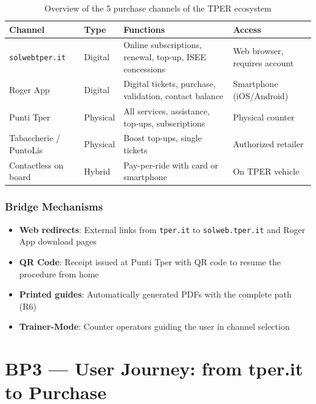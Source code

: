 ﻿\documentclass[11pt,a4paper]{article}
\begin{document}
\begin{table}[H]
\centering
\small
\renewcommand{\arraystretch}{1.3}
\begin{tabular}{|p{2.5cm}|p{3.5cm}|p{3.5cm}|p{3.5cm}|}
\hline
\textbf{Channel} & \textbf{Type} & \textbf{Functions} & \textbf{Access} \\
\hline
\texttt{solweb}\discretionary{-}{-}{.}\texttt{tper.it} & Digital & Online subscriptions, renewal, top-up, ISEE concessions & Web browser, requires account \\
\hline
Roger App & Digital & Digital tickets, purchase, validation, contact balance & Smartphone (iOS/Android) \\
\hline
Punti Tper & Physical & All services, assistance, top-ups, subscriptions & Physical counter \\
\hline
Tabaccherie / PuntoLis & Physical & Boost top-ups, single tickets & Authorized retailer \\
\hline
Contactless on board & Hybrid & Pay-per-ride with card or smartphone & On TPER vehicle \\
\hline
\end{tabular}
\caption{Overview of the 5 purchase channels of the TPER ecosystem}
\label{tab:canali}
\end{table}

\subsubsection*{Bridge Mechanisms}
\begin{itemize}
    \item \textbf{Web redirects}: External links from \texttt{tper.it} to \texttt{solweb.tper.it} and Roger App download pages
    \item \textbf{QR Code}: Receipt issued at Punti Tper with QR code to resume the procedure from home
    \item \textbf{Printed guides}: Automatically generated PDFs with the complete path (R6)
    \item \textbf{Trainer-Mode}: Counter operators guiding the user in channel selection
\end{itemize}

\vspace{0.3cm}

\section{BP3 --- User Journey: from tper.it to Purchase}
\end{document}
